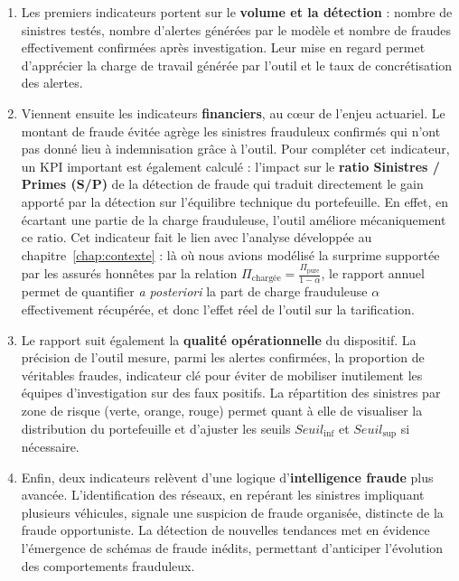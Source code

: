 \begin{enumerate}

    \item Les premiers indicateurs portent sur le \textbf{volume et la détection} : nombre de sinistres testés, nombre d'alertes générées par le modèle et nombre de fraudes effectivement confirmées après investigation. Leur mise en regard permet d'apprécier la charge de travail générée par l'outil et le taux de concrétisation des alertes.

    \item Viennent ensuite les indicateurs \textbf{financiers}, au cœur de l'enjeu actuariel. Le montant de fraude évitée agrège les sinistres frauduleux confirmés qui n'ont pas donné lieu à indemnisation grâce à l'outil. Pour compléter cet indicateur, un KPI important est également calculé : l'impact sur le \textbf{ratio Sinistres / Primes (S/P)} de la détection de fraude qui traduit directement le gain apporté par la détection sur l'équilibre technique du portefeuille. En effet, en écartant une partie de la charge frauduleuse, l'outil améliore mécaniquement ce ratio. Cet indicateur fait le lien avec l'analyse développée au chapitre~\ref{chap:contexte} : là où nous avions modélisé la surprime supportée par les assurés honnêtes par la relation $\Pi_{\text{chargée}} = \frac{\Pi_{\text{pure}}}{1 - \alpha}$, le rapport annuel permet de quantifier \textit{a posteriori} la part de charge frauduleuse $\alpha$ effectivement récupérée, et donc l'effet réel de l'outil sur la tarification.

    \item Le rapport suit également la \textbf{qualité opérationnelle} du dispositif. La précision de l'outil mesure, parmi les alertes confirmées, la proportion de véritables fraudes, indicateur clé pour éviter de mobiliser inutilement les équipes d'investigation sur des faux positifs. La répartition des sinistres par zone de risque (verte, orange, rouge) permet quant à elle de visualiser la distribution du portefeuille et d'ajuster les seuils $Seuil_{\inf}$ et $Seuil_{\sup}$ si nécessaire.

    \item Enfin, deux indicateurs relèvent d'une logique d'\textbf{intelligence fraude} plus avancée. L'identification des réseaux, en repérant les sinistres impliquant plusieurs véhicules, signale une suspicion de fraude organisée, distincte de la fraude opportuniste. La détection de nouvelles tendances met en évidence l'émergence de schémas de fraude inédits, permettant d'anticiper l'évolution des comportements frauduleux.

\end{enumerate}

